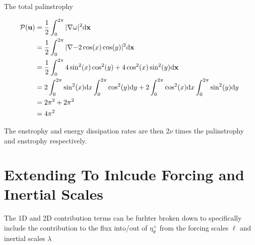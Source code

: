 \documentclass[9pt]{article}
\newcommand{\grad}[1]{\nabla{#1}}								%
\newcommand{\bfu}{\mathbf{u}}											%
\newcommand{\bfx}{\mathbf{x}}								%
\begin{document}
The total palinstrophy

\begin{align}
\mathcal{P}(\bfu) &= \frac{1}{2}\int_0^{2\pi} |\grad{\omega}|^2 \mathrm{d}\bfx \notag \\
									&= \frac{1}{2}\int_0^{2\pi} |\grad{-2\cos(x)\cos(y)}|^2 \mathrm{d}\bfx \notag \\
									&= \frac{1}{2}\int_0^{2\pi} 4\sin^2(x)\cos^2(y) + 4\cos^2(x)\sin^2(y) \mathrm{d}\bfx \notag \\
									&= 2\int_0^{2\pi} \sin^2(x)\mathrm{d}x\int_0^{2\pi}\cos^2(y)\mathrm{d}y + 2\int_0^{2\pi}\cos^2(x)\mathrm{d}x\int_0^{2\pi}\sin^2(y) \mathrm{d}y \notag \\
									&= 2\pi^2 + 2\pi^2 \notag \\
									&= 4\pi^2
\end{align}

The enstrophy and energy dissipation rates are then $2\nu$ times the palinstrophy and enstrophy respectively.


\section{Extending To Inlcude Forcing and Inertial Scales}

The 1D and 2D contribution terms can be furhter broken down to specifically include the contribution to the flux into/out of $\eta_{\theta}^{+}$ from the forcing scales $\ell$ and inertial scales $\lambda$
\end{document}
